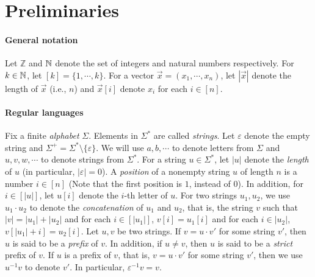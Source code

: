 
\section{Preliminaries}\label{sec-prel}

\paragraph{General notation} 
Let $\mathbb{Z}$ and $\mathbb{N}$ denote the set of integers and natural numbers respectively. For $k \in \mathbb{N}$, let $[k] = \{1,\cdots, k\}$. For a vector $\vec{x}=(x_1,\cdots, x_n)$, let $|\vec{x}|$ denote the length of $\vec{x}$ (i.e., $n$) and  $\vec{x}[i]$ denote $x_i$ for each $i \in [n]$. %


\paragraph{Regular languages}
Fix a finite \emph{alphabet} $\Sigma$. Elements in $\Sigma^*$ are called \emph{strings}. Let $\varepsilon$ denote the empty string and  $\Sigma^+ = \Sigma^* \setminus \{\varepsilon\}$. We will use $a,b,\cdots$ to denote letters from $\Sigma$ and $u, v, w, \cdots$ to denote strings from $\Sigma^*$. For a string $u \in \Sigma^*$, let $|u|$ denote the \emph{length} of $u$ (in particular, $|\varepsilon|=0$). A \emph{position} of a nonempty string $u$ of length $n$ is a number $i \in [n]$ (Note that the first position is $1$, instead of  0). In addition, for $i \in [|u|]$, let $u[i]$ denote the $i$-th letter of $u$. 
For two strings $u_1, u_2$, we use $u_1 \cdot u_2$ to denote the \emph{concatenation} of $u_1$ and $u_2$, that is, the string $v$ such that $|v|= |u_1| + |u_2|$ and for each $i \in [|u_1|]$, $v[i]= u_1[i]$ and for each $i \in |u_2|$, $v[|u_1|+i]=u_2[i]$. Let $u, v$ be two strings. If $v = u \cdot v'$ for some string $v'$, then $u$ is said to be a \emph{prefix} of $v$. In addition, if $u \neq v$, then $u$ is said to be a \emph{strict} prefix of $v$. If $u$ is a prefix of $v$, that is, $v = u \cdot v'$ for some string $v'$, then 
we use $u^{-1} v$ to denote $v'$. In particular, $\varepsilon^{-1} v = v$.

